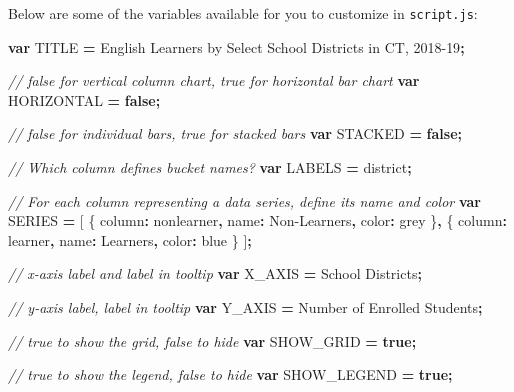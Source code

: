 \documentclass[
  english,
]{book}
\newenvironment{Shaded}{\begin{snugshade}}{\end{snugshade}}
\newcommand{\CommentTok}[1]{\textcolor[rgb]{0.56,0.35,0.01}{\textit{#1}}}
\newcommand{\DataTypeTok}[1]{\textcolor[rgb]{0.13,0.29,0.53}{#1}}
\newcommand{\KeywordTok}[1]{\textcolor[rgb]{0.13,0.29,0.53}{\textbf{#1}}}
\newcommand{\NormalTok}[1]{#1}
\newcommand{\OperatorTok}[1]{\textcolor[rgb]{0.81,0.36,0.00}{\textbf{#1}}}
\newcommand{\StringTok}[1]{\textcolor[rgb]{0.31,0.60,0.02}{#1}}
\begin{document}
Below are some of the variables available for you to customize in \texttt{script.js}:

\begin{Shaded}
\begin{Highlighting}[]
\KeywordTok{var}\NormalTok{ TITLE }\OperatorTok{=} \StringTok{\textquotesingle{}English Learners by Select School Districts in CT, 2018{-}19\textquotesingle{}}\OperatorTok{;}

\CommentTok{// \textasciigrave{}false\textasciigrave{} for vertical column chart, \textasciigrave{}true\textasciigrave{} for horizontal bar chart}
\KeywordTok{var}\NormalTok{ HORIZONTAL }\OperatorTok{=} \KeywordTok{false}\OperatorTok{;}

\CommentTok{// \textasciigrave{}false\textasciigrave{} for individual bars, \textasciigrave{}true\textasciigrave{} for stacked bars}
\KeywordTok{var}\NormalTok{ STACKED }\OperatorTok{=} \KeywordTok{false}\OperatorTok{;}  

\CommentTok{// Which column defines \textquotesingle{}bucket\textquotesingle{} names?}
\KeywordTok{var}\NormalTok{ LABELS }\OperatorTok{=} \StringTok{\textquotesingle{}district\textquotesingle{}}\OperatorTok{;}  

\CommentTok{// For each column representing a data series, define its name and color}
\KeywordTok{var}\NormalTok{ SERIES }\OperatorTok{=}\NormalTok{ [  }
\NormalTok{  \{}
    \DataTypeTok{column}\OperatorTok{:} \StringTok{\textquotesingle{}nonlearner\textquotesingle{}}\OperatorTok{,}
    \DataTypeTok{name}\OperatorTok{:} \StringTok{\textquotesingle{}Non{-}Learners\textquotesingle{}}\OperatorTok{,}
    \DataTypeTok{color}\OperatorTok{:} \StringTok{\textquotesingle{}grey\textquotesingle{}}
\NormalTok{  \}}\OperatorTok{,}
\NormalTok{  \{}
    \DataTypeTok{column}\OperatorTok{:} \StringTok{\textquotesingle{}learner\textquotesingle{}}\OperatorTok{,}
    \DataTypeTok{name}\OperatorTok{:} \StringTok{\textquotesingle{}Learners\textquotesingle{}}\OperatorTok{,}
    \DataTypeTok{color}\OperatorTok{:} \StringTok{\textquotesingle{}blue\textquotesingle{}}
\NormalTok{  \}}
\NormalTok{]}\OperatorTok{;}

\CommentTok{// x{-}axis label and label in tooltip}
\KeywordTok{var}\NormalTok{ X\_AXIS }\OperatorTok{=} \StringTok{\textquotesingle{}School Districts\textquotesingle{}}\OperatorTok{;}

\CommentTok{// y{-}axis label, label in tooltip}
\KeywordTok{var}\NormalTok{ Y\_AXIS }\OperatorTok{=} \StringTok{\textquotesingle{}Number of Enrolled Students\textquotesingle{}}\OperatorTok{;}

\CommentTok{// \textasciigrave{}true\textasciigrave{} to show the grid, \textasciigrave{}false\textasciigrave{} to hide}
\KeywordTok{var}\NormalTok{ SHOW\_GRID }\OperatorTok{=} \KeywordTok{true}\OperatorTok{;}

\CommentTok{// \textasciigrave{}true\textasciigrave{} to show the legend, \textasciigrave{}false\textasciigrave{} to hide}
\KeywordTok{var}\NormalTok{ SHOW\_LEGEND }\OperatorTok{=} \KeywordTok{true}\OperatorTok{;}
\end{Highlighting}
\end{Shaded}
\end{document}
